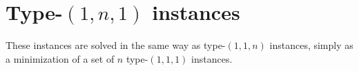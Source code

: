 \section{Type-$(1, n, 1)$ instances}

These instances are solved in the same way as type-$(1, 1, n)$ instances, simply as a minimization of a set of $n$ type-$(1, 1, 1)$ instances.
